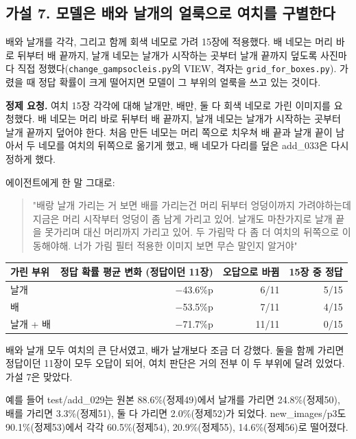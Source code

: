 \documentclass[11pt]{article}
\begin{document}
\subsection*{가설 7. 모델은 배와 날개의 얼룩으로 여치를 구별한다}

배와 날개를 각각, 그리고 함께 회색 네모로 가려 15장에 적용했다. 배 네모는 머리 바로 뒤부터 배 끝까지, 날개 네모는 날개가 시작하는 곳부터 날개 끝까지 덮도록 사진마다 직접 정했다(\texttt{change\_gampsocleis.py}의 VIEW, 격자는 \texttt{grid\_for\_boxes.py}). 가렸을 때 정답 확률이 크게 떨어지면 모델이 그 부위의 얼룩을 쓰고 있는 것이다.

\textbf{정제 요청.} 여치 15장 각각에 대해 날개만, 배만, 둘 다 회색 네모로 가린 이미지를 요청했다. 배 네모는 머리 바로 뒤부터 배 끝까지, 날개 네모는 날개가 시작하는 곳부터 날개 끝까지 덮어야 한다. 처음 만든 네모는 머리 쪽으로 치우쳐 배 끝과 날개 끝이 남아서 두 네모를 여치의 뒤쪽으로 옮기게 했고, 배 네모가 다리를 덮은 add\_033은 다시 정하게 했다.

에이전트에게 한 말 그대로:
\begin{quote}
"배랑 날개 가리는 거 보면 배를 가리는건 머리 뒤부터 엉덩이까지 가려야하는데 지금은 머리 시작부터 엉덩이 좀 남게 가리고 있어. 날개도 마찬가지로 날개 끝을 못가리며 대신 머리까지 가리고 있어. 두 가림막 다 좀 더 여치의 뒤쪽으로 이동해야해. 너가 가림 필터 적용한 이미지 보면 무슨 말인지 알거야"
\end{quote}

\begin{center}\footnotesize
\begin{tabular}{lrrr}
\toprule
가린 부위 & 정답 확률 평균 변화 (정답이던 11장) & 오답으로 바뀜 & 15장 중 정답 \\
\midrule
날개 & $-$43.6\%p & 6/11 & 5/15 \\
배 & $-$53.5\%p & 7/11 & 4/15 \\
날개 + 배 & $-$71.7\%p & 11/11 & 0/15 \\
\bottomrule
\end{tabular}
\end{center}

배와 날개 모두 여치의 큰 단서였고, 배가 날개보다 조금 더 강했다. 둘을 함께 가리면 정답이던 11장이 모두 오답이 되어, 여치 판단은 거의 전부 이 두 부위에 달려 있었다. 가설 7은 맞았다.

예를 들어 test/add\_029는 원본 88.6\%(정제49)에서 날개를 가리면 24.8\%(정제50), 배를 가리면 3.3\%(정제51), 둘 다 가리면 2.0\%(정제52)가 되었다. new\_images/p3도 90.1\%(정제53)에서 각각 60.5\%(정제54), 20.9\%(정제55), 14.6\%(정제56)로 떨어졌다.
\end{document}
